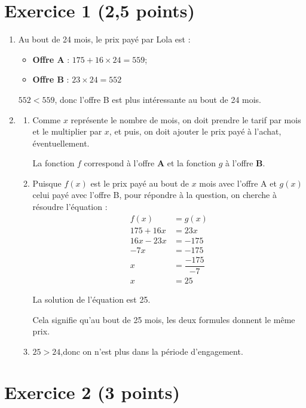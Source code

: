\documentclass[12pt,a4paper,french]{article}
\begin{document}
\section*{Exercice 1 (2,5 points)}

\begin{enumerate}
	\item Au bout de 24 mois, le prix payé par Lola est :
	\begin{itemize}
		\item \textbf{Offre A} : \quad $175+16\times 24=559$;
		\item \textbf{Offre B} : \quad $23\times 24=552$
	\end{itemize}

	$552 < 559$, \quad donc l'offre B est plus intéressante au bout de 24 mois.

	\item \begin{enumerate}
		\item Comme $x$ représente le nombre de mois, on doit prendre le tarif par mois et le multiplier par $x$, et puis, on doit ajouter le prix payé à l'achat, éventuellement.

		La fonction $f$ correspond à l'offre \textbf{A} et la fonction $g$ à l'offre \textbf{B}.

		\item Puisque $f(x)$ est le prix payé au bout de $x$ mois avec l'offre A et $g(x)$ celui payé avec l'offre B, pour répondre à la question, on cherche à résoudre l'équation :
		\begin{align*}
		f(x)&=g(x)\\
		175+16x&=23x\\
		16x-23x&=-175\\
		-7x&=-175\\
		x&=\dfrac{-175}{-7}\\
		x&=25
		\end{align*}

		La solution de l'équation est 25.

		Cela signifie qu'au bout de 25 mois, les deux formules donnent le même prix.

		\item $25>24$,\quad donc on n'est plus dans la période d'engagement.
	\end{enumerate}
\end{enumerate}

\newpage
\section*{Exercice 2 (3 points)}
\end{document}
